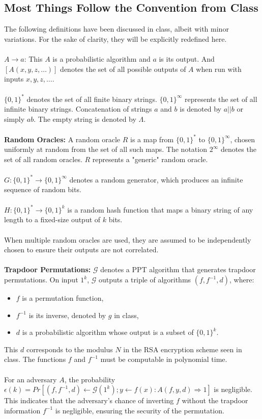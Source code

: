 \documentclass{article}
\begin{document}
\subsection{Most Things Follow the Convention from Class}
The following definitions have been discussed in class, albeit with minor variations. For the sake of clarity, they will be explicitly redefined here.\\\\
$A \rightarrow a$: This $A$ is a probabilistic algorithm and $a$ is its output. And $[A(x, y, z, \dots)]$ denotes the set of all possible outputs of $A$ when run with inputs $x, y, z, \ldots$.\\
\\
$\{0, 1\}^*$ denotes the set of all finite binary strings. $\{0, 1\}^\infty$ represents the set of all infinite binary strings. Concatenation of strings $a$ and $b$ is denoted by $a||b$ or simply $ab$. The empty string is denoted by $\Lambda$.\\
\\
\textbf{Random Oracles:} A random oracle $R$ is a map from $\{0, 1\}^*$ to $\{0, 1\}^\infty$, chosen uniformly at random from the set of all such maps. The notation $2^\infty$ denotes the set of all random oracles. $R$ represents a "generic" random oracle.
\\
\\
$G: \{0, 1\}^* \rightarrow \{0, 1\}^\infty$ denotes a random generator, which produces an infinite sequence of random bits.
\\
\\
$H: \{0, 1\}^* \rightarrow \{0, 1\}^k$ is a random hash function that maps a binary string of any length to a fixed-size output of $k$ bits.
\\
\\
When multiple random oracles are used, they are assumed to be independently chosen to ensure their outputs are not correlated.\\
\\
\textbf{Trapdoor Permutations:}
$\mathcal{G}$ denotes a PPT algorithm that generates trapdoor permutations. On input $1^k$, $\mathcal{G}$ outputs a triple of algorithms $(f, f^{-1}, d)$, where:
\begin{itemize}
    \item $f$ is a permutation function,
    \item $f^{-1}$ is its inverse, denoted by $g$ in class,
    \item $d$ is a probabilistic algorithm whose output is a subset of $\{0, 1\}^k$.
\end{itemize}
This $d$ corresponds to the modulus $N$ in the RSA encryption scheme seen in class. The functions $f$ and $f^{-1}$ must be computable in polynomial time.\\
\\
For an adversary $A$, the probability $\epsilon(k) = Pr[(f, f^{-1}, d) \leftarrow \mathcal{G}(1^k); y \leftarrow f(x): A(f, y, d) \Rightarrow 1]$ is negligible. This indicates that the adversary's chance of inverting $f$ without the trapdoor information $f^{-1}$ is negligible, ensuring the security of the permutation.
\end{document}
